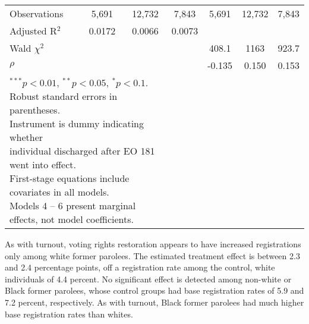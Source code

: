 \documentclass[
  12pt,
]{article}
\begin{document}
\begin{singlespace}
\begin{table}[H]
\begin{tabular}{lcccccc}
\hline
Observations & 5,691 & 12,732 & 7,843 & 5,691 & 12,732 & 7,843 \\
Adjusted R$^2$ & 0.0172 & 0.0066 & 0.0073 &  &  &  \\
Wald $\chi^2$ &  &  &  & 408.1 & 1163 & 923.7 \\
 $\rho$ &  &  &  & -0.135 & 0.150 & 0.153 \\
\hline
\multicolumn{3}{l}{\scriptsize{\parbox{.5\linewidth}{\vspace{2pt}$^{***}p<0.01$, $^{**}p<0.05$, $^*p<0.1$. \\
Robust standard errors in parentheses. \\
Instrument is dummy indicating whether \\
individual discharged after EO 181 went into effect. \\
First-stage equations include covariates in all models. \\
Models 4 -- 6 present marginal effects, not model coefficients.}}}
\end{tabular}
\end{table}

\end{singlespace}

As with turnout, voting rights restoration appears to have increased registrations only among white former parolees. The estimated treatment effect is between 2.3 and 2.4 percentage points, off a registration rate among the control, white individuals of 4.4 percent. No significant effect is detected among non-white or Black former parolees, whose control groups had base registration rates of 5.9 and 7.2 percent, respectively. As with turnout, Black former parolees had much higher base registration rates than whites.
\end{document}
